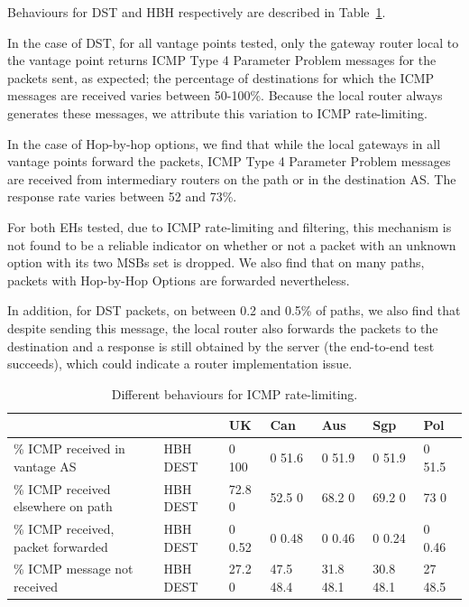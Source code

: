 \documentclass[conference]{IEEEtran}
\begin{document}
Behaviours for DST and HBH respectively are described in Table~\ref{tbl:icmp_support_dst}.

In the case of DST, for all vantage points tested, only the gateway router local to the vantage point returns ICMP Type 4 Parameter Problem messages for the packets sent, as expected; the percentage of destinations for which the ICMP messages are received varies between 50-100\%. Because the local router always generates these messages, we attribute this variation to ICMP rate-limiting. 

In the case of Hop-by-hop options, we find that while the local gateways in all vantage points forward the packets,  ICMP Type 4 Parameter Problem messages are received from intermediary routers on the path or in the destination AS. The response rate varies between 52 and 73\%. 

For both EHs tested, due to ICMP rate-limiting and filtering, this mechanism is not found to be a reliable indicator on whether or not a packet with an unknown option with its two MSBs set is dropped. We also find that on many paths, packets with Hop-by-Hop Options are forwarded nevertheless.

In addition, for DST packets, on between 0.2 and 0.5\% of paths, we also find that despite sending this message, the local router also forwards the packets to the destination and a response is still obtained by the server (the end-to-end test succeeds), which could indicate a router implementation issue.

\begin{table}
\begin{tabular}{p{}|p{}|p{}|p{}|p{}|p{}|p{}}

\centering

                                           &             & UK        & Can       & Aus    & Sgp          & Pol     \\
                                           \hline

{\% ICMP received in vantage AS}        & {HBH DEST} & {0 100}  & {0 51.6}    & {0 51.9}    & {0 51.9}    & {0 51.5}  \\
\hline
{\% ICMP received elsewhere on path}          & {HBH DEST} & {72.8 0} & {52.5 0}    & {68.2 0}    & {69.2 0}    & {73  0}    \\
\hline

{\% ICMP received, packet forwarded}          & {HBH DEST} & {0 0.52} & {0 0.48}    & {0 0.46}    & {0 0.24}    & {0 0.46}  \\
\hline

{\% ICMP message not received} & {HBH DEST} & {27.2 0} & {47.5 48.4} & {31.8 48.1} & {30.8 48.1} & {27 48.5} 
\end{tabular}
\caption{Different behaviours for ICMP rate-limiting.}
\label{tbl:icmp_support_dst}
\end{table}
\end{document}
